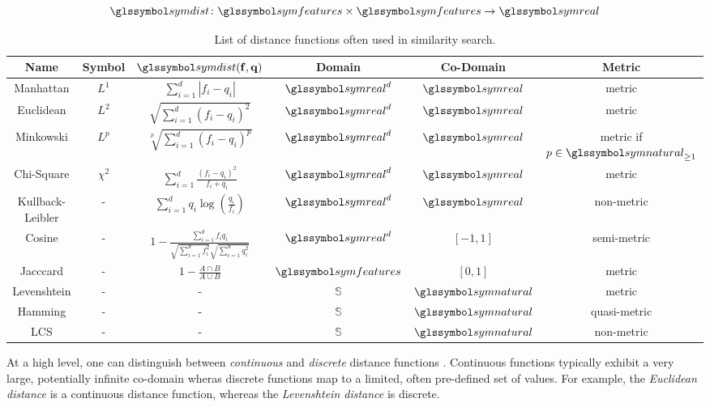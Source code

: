 \begin{equation}
    \label{eq:distance_function}
    \symdist \colon \symfeatures \times \symfeatures \rightarrow \symreal
\end{equation}

\begin{table}[hb]
    \begin{tabular}{ | c | c | c | c | c | c |}
        \hline
        \textbf{Name} & \textbf{Symbol} &  $\symdist \mathbf{(f,q)}$ & \textbf{Domain} & \textbf{Co-Domain} & \textbf{Metric} \\
        \hline
        \hline 
        Manhattan & $L^1$ & $\sum_{i=1}^{d} | f_i - q_i |$ & $\symreal^d$ & $\symreal$ & metric \\ 
        \hline
        Euclidean & $L^2$ & $\sqrt{\sum_{i=1}^{d} (f_i - q_i)^2}$ & $\symreal^d$ & $\symreal$ & metric \\  
        \hline
        Minkowski & $L^p$ & $\sqrt[p]{\sum_{i=1}^{d} (f_i - q_i)^p}$ & $\symreal^d$ & $\symreal$ & metric if $p \in \symnatural_{\geq 1}$ \\ 
        \hline
        Chi-Square & $\chi^2$ & $\sum_{i=1}^{d} \frac{(f_i - q_i)^2}{f_i + q_i}$ & $\symreal^d$ & $\symreal$ & metric \\ 
        \hline
        Kullback-Leibler & - & $\sum_{i=1}^{d} q_i \log (\frac{q_i}{f_i})$ & $\symreal^d$ & $\symreal$ & non-metric \\ 
        \hline
        Cosine & - & $1 - \frac{\sum_{i=1}^{d} f_{i}q_{i}}{\sqrt{\sum_{i=1}^{d} f_i^2} \sqrt{\sum_{i=1}^{d} q_i^2}}$ & $\symreal^d$ & $[-1, 1]$ & semi-metric \\  
        \hline
        Jacccard & - & $1 - \frac{A \cap B}{A \cup B}$ & $\symfeatures$ & $[0, 1]$ & metric \\
        \hline
        Levenshtein & - & - & $\mathbb{S}$ & $\symnatural$ & metric \\
        \hline
        Hamming & - & - &  $\mathbb{S}$ & $\symnatural$ & quasi-metric \\
        \hline
        LCS \cite{Hirschberg:1977Algorithms} & - & - &  $\mathbb{S}$ & $\symnatural$ & non-metric \\
        \hline
    \end{tabular}
    \caption{List of distance functions often used in similarity search.}
    \label{table:similarity_measures}
\end{table}

At a high level, one can distinguish between \emph{continuous} and \emph{discrete} distance functions \cite{Zezula:2006Similarity}. Continuous functions typically exhibit a very large, potentially infinite co-domain wheras discrete functions map to a limited, often pre-defined set of values. For example, the \emph{Euclidean distance} is a continuous distance function, whereas the \emph{Levenshtein distance} \cite{Levensthtein:1965Binary} is discrete.

